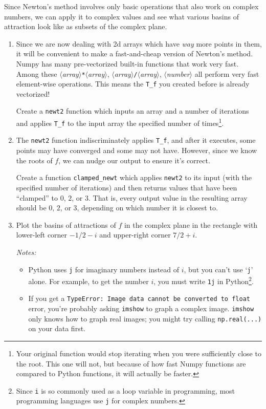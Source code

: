 \documentclass[letter]{article}
\newcommand{\var}[1]{{$\langle$\it #1$\rangle$}}
\begin{document}
\begin{enumerate}
			Since Newton's method involves only basic operations that also work on complex numbers,
			we can apply it to complex values and see what various basins of attraction look like as subsets of
			the complex plane.
			\begin{enumerate}
				\item Since we are now dealing with 2d arrays which have \emph{way} more points in them,
					it will be convenient to make a fast-and-cheap version of Newton's method. Numpy
					has many pre-vectorized built-in functions that work very fast. Among these
					\var{array}\verb|*|\var{array}, \var{array}\verb|/|\var{array}, \var{number}\pm\var{array}
					all perform very fast element-wise operations. This means the \verb|T_f| you created before
					is already vectorized!

					Create a \verb|newt2| function which inputs an array and a number of iterations
					and applies \verb|T_f| to the input array the specified number of times\footnote{ Your original
					function would stop iterating when you were sufficiently close to the root. This one will not,
					but because of how fast Numpy functions are compared to Python functions, it will actually
					be faster.}.
				\item The \verb|newt2| function indiscriminately applies \verb|T_f|, and after it executes, some points may
					have converged and some may not have. However, since we know the roots of $f$, we 
					can nudge our output
					to ensure it's correct.

					Create a function \verb|clamped_newt| which applies \verb|newt2| to its input 
					(with the specified number of iterations) and then returns values that have been ``clamped''
					to $0$, $2$, or $3$. That is, every output value in the resulting array should be $0$, $2$, or $3$,
					depending on which number it is closest to.

				\item Plot the basins of attractions of $f$ in the complex plane in the rectangle with lower-left corner
					$-1/2-i$ and upper-right corner $7/2+i$. 

					\emph{Notes:}
					\begin{itemize}
						\item Python uses {\tt j} for imaginary numbers
							instead of $i$, but you can't use `{\tt j}' alone. For example, to get the number $i$, you must
							write {\tt 1j} in Python\footnote{ Since {\tt i} is so commonly used
							as a loop variable in programming, most programming languages use {\tt j}
							for complex numbers.}.
						\item If you get a {\tt TypeError: Image data cannot be converted to float}
							error, you're probably asking {\tt imshow} to graph a complex image. {\tt imshow}
							only knows how to graph
					real images; you might try calling {\tt np.real(...)} on your data first.
					\end{itemize}


\end{enumerate}
\end{enumerate}
\end{document}
